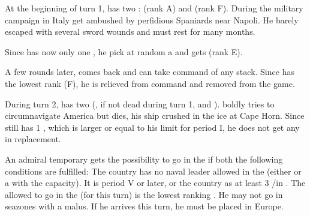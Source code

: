 \begin{exemple}
  At the beginning of turn 1, \FRA has two \LeaderG :  (rank A)
  and  (rank F). During the military campaign in Italy 
  get ambushed by perfidious Spaniards near Napoli. He barely escaped with
  several sword wounds and must rest for many months.

  Since \FRA has now only one \LeaderG, he pick at random a \anonyme\LeaderG
  and gets  (rank E).

  A few rounds later,  comes back and can take command of any
  stack. Since  has the lowest rank (F), he is relieved from command
  and removed from the game.

  \smallskip

  During turn 2, \POR has two \LeaderE (, if not dead during turn
  1, and ).  boldly tries to circumnavigate
  America but dies, his ship crushed in the ice at Cape Horn. Since \POR still
  has 1 \LeaderE, which is larger or equal to his limit for period I, he does
  not get any \anonyme\LeaderE in replacement.
\end{exemple}



An admiral temporary gets the possibility to go in the \ROTW if both the
following conditions are fulfilled:
\bparag The country has no naval leader allowed in the \ROTW (either \LeaderE
or a \LeaderA with the \ROTW capacity).
\bparag It is period V or later, or the country as at least 3 \COL/\TP in
.
\bparag The \LeaderA allowed to go in the \ROTW (for this turn) is the lowest
ranking \LeaderA. He may not go in seazones with a malus. If he arrives this
turn, he must be placed in Europe.


